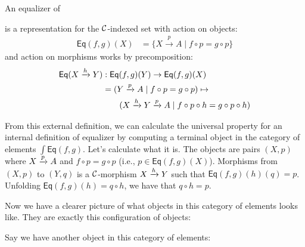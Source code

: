 \begin{definition}[Equalizer]
  \sloppy
  An equalizer of
is a representation for the $\mathcal C$-indexed set with action on 
objects:
\begin{align*}
  \mathsf{Eq}(f,g)(X) &= \{ X \xrightarrow{p} A \mid f \circ p = g \circ p \}
\end{align*}
and action on morphisms works by precomposition:
\begin{align*}
  \mathsf{Eq}(X \xrightarrow{h} Y) &: \mathsf{Eq}(f,g)(Y) \to \mathsf{Eq}(f,g)(X)\\
  &= (Y \xrightarrow{p} A \mid f \circ p = g \circ p) \mapsto  \\
  & \qquad (X \xrightarrow{h} Y \xrightarrow{p} A \mid f \circ p \circ h = g \circ p \circ h) 
\end{align*}
\end{definition}

From this external definition, we can calculate the universal 
property for an internal definition of equalizer by 
computing a terminal object in the category of elements $\int \mathsf{Eq}(f,g)$.
Let's calculate what it is.
The objects are pairs $(X, p)$ where $X \xrightarrow{p} A$ and $f \circ p = g \circ p$ (i.e., $p \in \mathsf{Eq}(f,g)(X)$).
Morphisms from $(X, p)$ to $(Y, q)$ 
is a $\mathcal C$-morphism $X \xrightarrow{h} Y$ such that 
$\mathsf{Eq}(f, g)(h)(q) = p$. Unfolding $\mathsf{Eq}(f, g)(h) = q \circ h$, 
we have that $q \circ h = p$.

Now we have a clearer picture of what objects in this category 
of elements looks like. They are exactly this configuration of objects:

\begin{center}
\end{center}

Say we have another object in this category of elements:
\begin{center}
\end{center}

